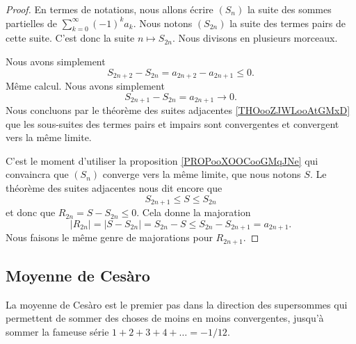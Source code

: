 \begin{proof}
	En termes de notations, nous allons écrire \( (S_n)\) la suite des sommes partielles de \( \sum_{k=0}^{\infty}(-1)^ka_k\). Nous notons \( (S_{2n})\) la suite des termes pairs de cette suite. C'est donc la suite \( n\mapsto S_{2n}\).
	Nous divisons en plusieurs morceaux.
	\begin{subproof}
		Nous avons simplement
		\begin{equation}
			S_{2n+2}-S_{2n}=a_{2n+2}-a_{2n+1}\leq 0.
		\end{equation}
		Même calcul.
		 Nous avons simplement
		\begin{equation}
			S_{2n+1}-S_{2n}=a_{2n+1}\to 0.
		\end{equation}
		Nous concluons par le théorème des suites adjacentes \ref{THOooZJWLooAtGMxD} que les sous-suites des termes pairs et impairs sont convergentes et convergent vers la même limite.
	\end{subproof}
    C'est le moment d'utiliser la proposition \ref{PROPooXOOCooGMqJNe} qui convaincra  que \( (S_n)\) converge vers la même limite, que nous notons \( S\). Le théorème des suites adjacentes nous dit encore que
	\begin{equation}
		S_{2n+1}\leq S\leq S_{2n}
	\end{equation}
	et donc que \( R_{2n}=S-S_{2n}\leq 0\). Cela donne la majoration
	\begin{equation}
        | R_{2n} |=| S-S_{2n} |=S_{2n}-S\leq S_{2n}-S_{2n+1}=a_{2n+1}.
	\end{equation}
	Nous faisons le même genre de majorations pour \( R_{2n+1}\).
\end{proof}

\subsection{Moyenne de Cesàro}

La moyenne de Cesàro est le premier pas dans la direction des supersommes\cite{BIBooUCSPooNKNWEK} qui permettent de sommer des choses de moins en moins convergentes, jusqu'à sommer la fameuse série \( 1+2+3+4+\ldots=-1/12\).

